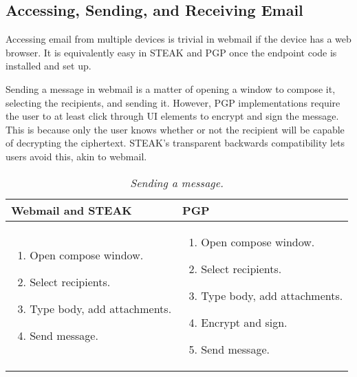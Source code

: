 \subsection{Accessing, Sending, and Receiving Email}

Accessing email from multiple devices is trivial in webmail if the device has a web browser.  It is equivalently easy in STEAK and PGP once the endpoint code is installed and set up.

Sending a message in webmail is a matter of opening a window to compose it, selecting the recipients, and sending it.  However, PGP implementations require the user to at least click through UI elements to encrypt and sign the message.  This is because only the user knows whether or not the recipient will be capable of decrypting the ciphertext.  STEAK's transparent backwards compatibility lets users avoid this, akin to webmail.

\begin{table}[ht!]
\begin{tabular}{ | L{3.5cm} | L{3.5cm} |}
\hline
\textbf{Webmail and STEAK} & \textbf{PGP} \\
\hline
\vspace{-3mm}
\begin{enumerate}
  \item{Open compose window.}
  \item{Select recipients.} 
  \item{Type body, add attachments.}
  \item{Send message.}
\end{enumerate} 
\vspace{-\topsep} &

\vspace{-3mm}
\begin{enumerate}
  \item{Open compose window.}
  \item{Select recipients.}
  \item{Type body, add attachments.}
  \item{Encrypt and sign.}
  \item{Send message.}
\end{enumerate} 
\vspace{-\topsep} \\

\hline
\end{tabular}
\caption{\it Sending a message.}
\label{tab:account-creation}
\end{table}


